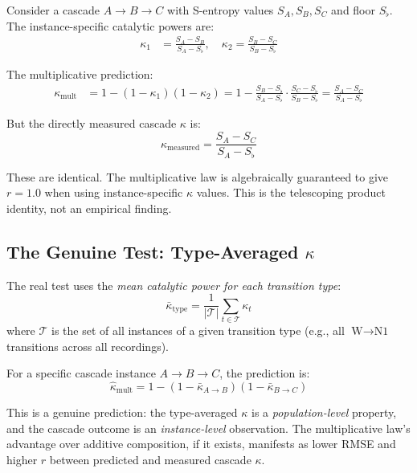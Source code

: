 \documentclass[11pt,a4paper]{article}
\theoremstyle{definition}
\theoremstyle{remark}
\newcommand{\Sfloor}{S_{\flat}}
\begin{document}
Consider a cascade $A \to B \to C$ with S-entropy values $S_A, S_B, S_C$ and floor $\Sfloor$. The instance-specific catalytic powers are:
\begin{align}
\kappa_1 &= \frac{S_A - S_B}{S_A - \Sfloor}, \quad
\kappa_2 = \frac{S_B - S_C}{S_B - \Sfloor}
\end{align}

The multiplicative prediction:
\begin{align}
\kappa_{\mathrm{mult}} &= 1 - (1-\kappa_1)(1-\kappa_2) = 1 - \frac{S_B - \Sfloor}{S_A - \Sfloor} \cdot \frac{S_C - \Sfloor}{S_B - \Sfloor} = \frac{S_A - S_C}{S_A - \Sfloor}
\end{align}

But the directly measured cascade $\kappa$ is:
\begin{equation}
\kappa_{\mathrm{measured}} = \frac{S_A - S_C}{S_A - \Sfloor}
\end{equation}

These are identical. The multiplicative law is algebraically guaranteed to give $r = 1.0$ when using instance-specific $\kappa$ values. This is the telescoping product identity, not an empirical finding.

\subsection{The Genuine Test: Type-Averaged $\kappa$}

The real test uses the \emph{mean catalytic power for each transition type}:
\begin{equation}
\bar{\kappa}_{\mathrm{type}} = \frac{1}{|\mathcal{T}|} \sum_{t \in \mathcal{T}} \kappa_t
\end{equation}
where $\mathcal{T}$ is the set of all instances of a given transition type (e.g., all $\text{W} \to \text{N1}$ transitions across all recordings).

For a specific cascade instance $A \to B \to C$, the prediction is:
\begin{equation}
\hat{\kappa}_{\mathrm{mult}} = 1 - (1 - \bar{\kappa}_{A \to B})(1 - \bar{\kappa}_{B \to C})
\end{equation}

This is a genuine prediction: the type-averaged $\kappa$ is a \emph{population-level} property, and the cascade outcome is an \emph{instance-level} observation. The multiplicative law's advantage over additive composition, if it exists, manifests as lower RMSE and higher $r$ between predicted and measured cascade $\kappa$.
\end{document}

